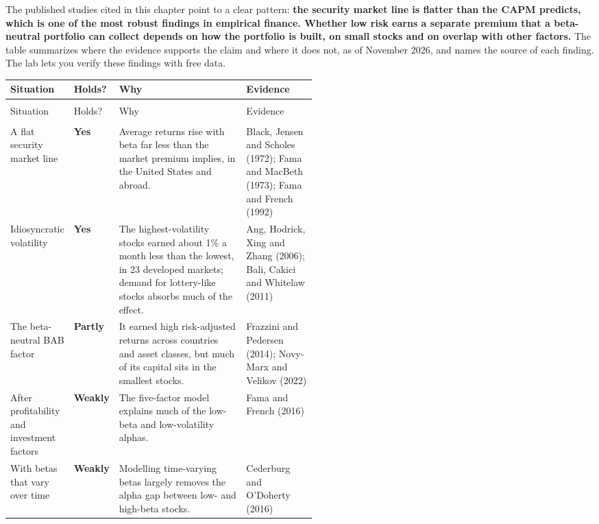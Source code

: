 The published studies cited in this chapter point to a clear pattern: \textbf{the security market line is flatter than the CAPM predicts, which is one of the most robust findings in empirical finance. Whether low risk earns a separate premium that a beta-neutral portfolio can collect depends on how the portfolio is built, on small stocks and on overlap with other factors.} The table summarizes where the evidence supports the claim and where it does not, as of November 2026, and names the source of each finding. The lab lets you verify these findings with free data.

{\small
\begin{longtable}{@{}>{\raggedright\arraybackslash}p{0.19\linewidth}>{\raggedright\arraybackslash}p{0.10\linewidth}>{\raggedright\arraybackslash}p{}>{\raggedright\arraybackslash}p{0.23\linewidth}@{}}
\toprule
Situation & Holds? & Why & Evidence \\
\midrule
\endfirsthead
\multicolumn{4}{@{}l}{\emph{(continued)}} \\
\toprule
Situation & Holds? & Why & Evidence \\
\midrule
\endhead
\midrule
\multicolumn{4}{r@{}}{\emph{(continued on the next page)}} \\
\endfoot
\bottomrule
\endlastfoot
A flat security market line & \textbf{Yes} & Average returns rise with beta far less than the market premium implies, in the United States and abroad. & Black, Jensen and Scholes (1972); Fama and MacBeth (1973); Fama and French (1992) \\
\addlinespace[3pt]
Idiosyncratic volatility & \textbf{Yes} & The highest-volatility stocks earned about 1\% a month less than the lowest, in 23 developed markets; demand for lottery-like stocks absorbs much of the effect. & Ang, Hodrick, Xing and Zhang (2006); Bali, Cakici and Whitelaw (2011) \\
\addlinespace[3pt]
The beta-neutral BAB factor & \textbf{Partly} & It earned high risk-adjusted returns across countries and asset classes, but much of its capital sits in the smallest stocks. & Frazzini and Pedersen (2014); Novy-Marx and Velikov (2022) \\
\addlinespace[3pt]
After profitability and investment factors & \textbf{Weakly} & The five-factor model explains much of the low-beta and low-volatility alphas. & Fama and French (2016) \\
\addlinespace[3pt]
With betas that vary over time & \textbf{Weakly} & Modelling time-varying betas largely removes the alpha gap between low- and high-beta stocks. & Cederburg and O'Doherty (2016) \\

\end{longtable}}
